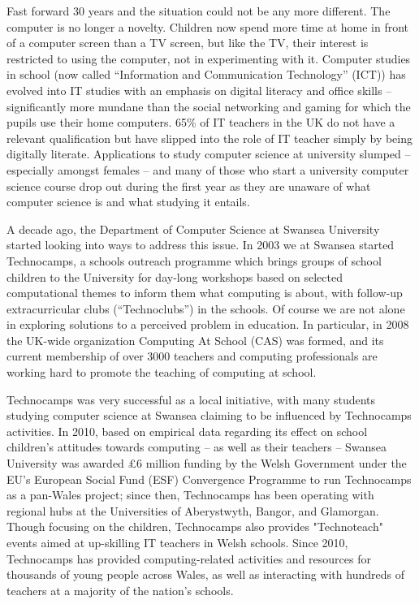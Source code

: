 \documentclass{sig-alternate}
\begin{document}
Fast forward 30 years and the situation could not be any more
different. The computer is no longer a novelty. Children now spend
more time at home in front of a computer screen than a TV screen, but
like the TV, their interest is restricted to using the computer, not
in experimenting with it. Computer studies in school (now called
``Information and Communication Technology'' (ICT)) has evolved into IT
studies with an emphasis on digital literacy and office skills --
significantly more mundane than the social networking and gaming for
which the pupils use their home computers. 65\% of IT teachers in the
UK do not have a relevant qualification but have slipped into the role
of IT teacher simply by being digitally literate. Applications to
study computer science at university slumped -- especially amongst
females -- and many of those who start a university computer science
course drop out during the first year as they are unaware of what
computer science is and what studying it entails.

A decade ago, the Department of Computer Science at Swansea University
started looking into ways to address this issue. In 2003 we at Swansea
started Technocamps, a schools outreach programme which brings groups
of school children to the University for day-long workshops based on
selected computational themes to inform them what computing is about,
with follow-up extracurricular clubs (``Technoclubs'') in the
schools. Of course we are not alone in exploring solutions to a
perceived problem in education. In particular, in 2008 the UK-wide
organization Computing At School (CAS) was formed, and its current
membership of over 3000 teachers and computing professionals are
working hard to promote the teaching of computing at school.

Technocamps was very successful as a local initiative, with many
students studying computer science at Swansea claiming to be
influenced by Technocamps activities. In 2010, based on empirical data
regarding its effect on school children's attitudes towards computing
-- as well as their teachers -- Swansea University was awarded £6
million funding by the Welsh Government under the EU's European Social
Fund (ESF) Convergence Programme to run Technocamps as a pan-Wales
project; since then, Technocamps has been operating with regional hubs
at the Universities of Aberystwyth, Bangor, and Glamorgan. Though
focusing on the children, Technocamps also provides "Technoteach"
events aimed at up-skilling IT teachers in Welsh schools. Since 2010,
Technocamps has provided computing-related activities and resources
for thousands of young people across Wales, as well as interacting
with hundreds of teachers at a majority of the nation's schools.
\end{document}
